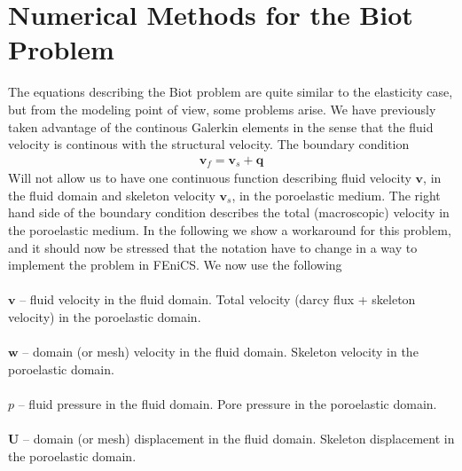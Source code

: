 \chapter{Numerical Methods for the Biot Problem}
The equations describing the Biot problem are quite similar to the elasticity case, but from the modeling point of view, some problems arise. We have previously taken advantage of the continous Galerkin elements in the sense that the fluid velocity is continous with the structural velocity. The boundary condition
\begin{align}
\mathbf{v}_f = \mathbf{v}_s + \mathbf{q} \label{BiotFlux}
\end{align}
Will not allow us to have one continuous function describing fluid velocity $\mathbf{v}$, in the fluid domain and skeleton velocity $\mathbf{v}_s$, in the poroelastic medium. The right hand side of the boundary condition describes the total (macroscopic) velocity in the poroelastic medium. In the following we show a workaround for this problem, and it should now be stressed that the notation have to change in a way to implement the problem in FEniCS. We now use the following
\\
\\
$\mathbf{v}$ -- fluid velocity in the fluid domain. Total velocity (darcy flux + skeleton velocity) in the poroelastic domain.
\\
\\
$\mathbf{w}$ -- domain (or mesh) velocity in the fluid domain. Skeleton velocity in the poroelastic domain.
\\
\\
$p$ -- fluid pressure in the fluid domain. Pore pressure in the poroelastic domain. 
\\
\\
$\mathbf{U}$ -- domain (or mesh) displacement in the fluid domain. Skeleton displacement in the poroelastic domain. 

\clearpage

